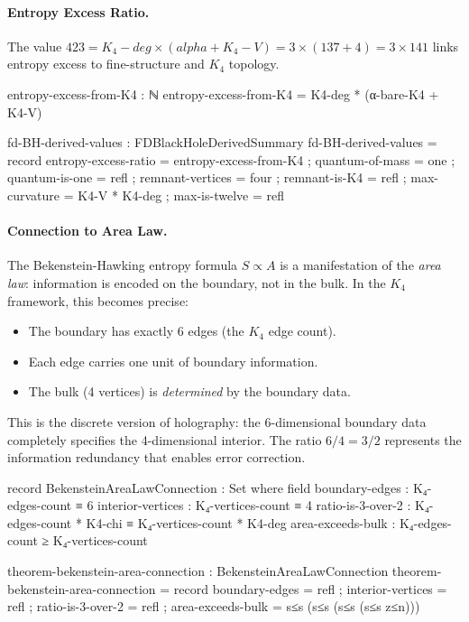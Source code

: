 \documentclass[11pt,a4paper]{book}
\def\alpha{alpha}%
\def\text#1{#1}%
\begin{document}
\paragraph{Entropy Excess Ratio.}
The value $423 = K_4\text{-deg} \times (\alpha + K_4\text{-}V) = 3 \times (137 + 4) = 3 \times 141$
links entropy excess to fine-structure and $K_4$ topology.

\begin{code}
  entropy-excess-from-K4 : ℕ
  entropy-excess-from-K4 = K4-deg * (α-bare-K4 + K4-V)

  fd-BH-derived-values : FDBlackHoleDerivedSummary
  fd-BH-derived-values = record
    { entropy-excess-ratio = entropy-excess-from-K4
    ; quantum-of-mass = one
    ; quantum-is-one = refl
    ; remnant-vertices = four
    ; remnant-is-K4 = refl
    ; max-curvature = K4-V * K4-deg
    ; max-is-twelve = refl
    }
\end{code}

\paragraph{Connection to Area Law.}

The Bekenstein-Hawking entropy formula $S \propto A$ is a manifestation of the 
\emph{area law}: information is encoded on the boundary, not in the bulk. In 
the $K_4$ framework, this becomes precise:

\begin{itemize}
\item The boundary has exactly 6 edges (the $K_4$ edge count).
\item Each edge carries one unit of boundary information.
\item The bulk (4 vertices) is \emph{determined} by the boundary data.
\end{itemize}

This is the discrete version of holography: the 6-dimensional boundary data 
completely specifies the 4-dimensional interior. The ratio $6/4 = 3/2$ 
represents the information redundancy that enables error correction.

\begin{code}
record BekensteinAreaLawConnection : Set where
  field
    boundary-edges     : K₄-edges-count ≡ 6
    interior-vertices  : K₄-vertices-count ≡ 4
    ratio-is-3-over-2  : K₄-edges-count * K4-chi ≡ K₄-vertices-count * K4-deg
    area-exceeds-bulk  : K₄-edges-count ≥ K₄-vertices-count

theorem-bekenstein-area-connection : BekensteinAreaLawConnection
theorem-bekenstein-area-connection = record
  { boundary-edges = refl
  ; interior-vertices = refl
  ; ratio-is-3-over-2 = refl
  ; area-exceeds-bulk = s≤s (s≤s (s≤s (s≤s z≤n)))
  }
\end{code}
  
\end{document}
